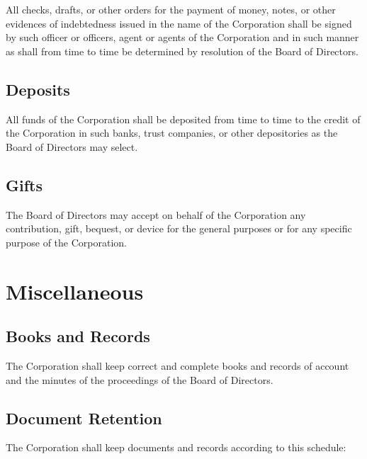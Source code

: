 \documentclass[12pt]{report}
\begin{document}
All checks, drafts, or other orders for the payment of money, notes, or other evidences of indebtedness issued in the name of the Corporation shall be signed by such officer or officers, agent or agents of the Corporation and in such manner as shall from time to time be determined by resolution of the Board of Directors.

\section{Deposits}

All funds of the Corporation shall be deposited from time to time to the credit of the Corporation in such banks, trust companies, or other depositories as the Board of Directors may select.

\section{Gifts}

The Board of Directors may accept on behalf of the Corporation any contribution, gift, bequest, or device for the general purposes or for any specific purpose of the Corporation.

\chapter{Miscellaneous}

\section{Books and Records}

The Corporation shall keep correct and complete books and records of account and the minutes of the proceedings of the Board of Directors.

\section{Document Retention}

The Corporation shall keep documents and records according to this schedule:
\end{document}
